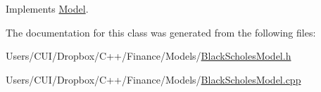 Implements \hyperlink{class_model_a087d56280bb51e8b04be3a9a30d06c76}{Model}.



The documentation for this class was generated from the following files\+:\begin{DoxyCompactItemize}
\item 
Users/\+C\+U\+I/\+Dropbox/\+C++/\+Finance/\+Models/\hyperlink{_black_scholes_model_8h}{Black\+Scholes\+Model.\+h}\item 
Users/\+C\+U\+I/\+Dropbox/\+C++/\+Finance/\+Models/\hyperlink{_black_scholes_model_8cpp}{Black\+Scholes\+Model.\+cpp}\end{DoxyCompactItemize}
